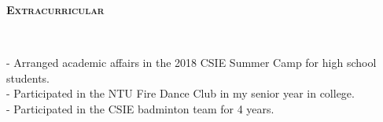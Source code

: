\documentclass[10pt]{article}
\newenvironment{changemargin}[2]{%
  \begin{list}{}{%
    \setlength{\topsep}{0pt}%
    \setlength{\leftmargin}{#1}%
    \setlength{\rightmargin}{#2}%
    \setlength{\listparindent}{\parindent}%
    \setlength{\itemindent}{\parindent}%
    \setlength{\parsep}{\parskip}%
  }%
  \item[]}{\end{list}
}
\newcommand{\lineover}{
	\begin{changemargin}{-0.05in}{-0.05in}
		\vspace*{-8pt}
		\hrulefill \\
		\vspace*{-2pt}
	\end{changemargin}
}
\newcommand{\header}[1]{
	\begin{changemargin}{-0.5in}{-0.5in}
		\large{\bf \scshape{#1}}\\
  	\lineover
	\end{changemargin}
}
\newenvironment{body} {
	\vspace*{-16pt}
	\begin{changemargin}{-0.25in}{-0.5in}
  }	
	{\end{changemargin}
}
\begin{document}
\smallskip



\header{Extracurricular}

\begin{body}
    \vspace{14pt}
        - Arranged academic affairs in the 2018 CSIE Summer Camp for high school students.\\
		- Participated in the NTU Fire Dance Club in my senior year in college.\\
    	- Participated in the CSIE badminton team for 4 years.\\
	\smallskip		 	   	
	
\end{body}
\end{document}
